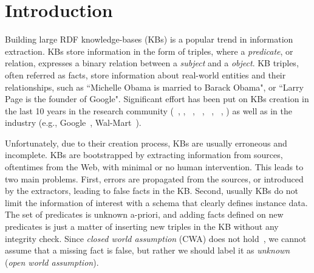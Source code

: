 \section{Introduction}

Building large RDF knowledge-bases (KBs) is a popular trend in information extraction.
KBs store information in the form of triples, where a \emph{predicate}, or relation, expresses a binary relation between a \emph{subject} and a \emph{object}. KB triples, often referred as facts, store information about real-world entities and their relationships, such as %
``Michelle Obama is married to Barack Obama", or ``Larry Page is the founder of Google".
Significant effort has been put on KBs creation in the last 10 years in the research community (~\cite{bizer2009dbpedia}, \cite{bollacker2008freebase}, ~\cite{vrandevcic2014wikidata}, \deepdive~\cite{shin2015incremental}, ~\cite{suchanek2008yago}, ~\cite{carlson2010toward}, \cite{banko2007open}) as well as in the industry %
(e.g., 
Google~\cite{dong2014knowledge}, Wal-Mart~\cite{deshpande2013building}).

Unfortunately, due to their creation process, KBs are usually erroneous and incomplete.
KBs are bootstrapped by extracting information from sources, oftentimes from the Web, with minimal or no human intervention.  This leads to two main problems. First, errors are propagated from the sources, or introduced by the extractors, leading to false facts in the KB. Second, usually KBs do not limit the information of interest with a schema that clearly defines instance data. The set of predicates is unknown a-priori, and adding facts defined on new predicates is just a matter of inserting new triples in the KB without any integrity check.  
Since \emph{closed world assumption} (CWA) does not hold~\cite{dong2014knowledge,galarraga2015fast}, we cannot assume that a missing fact is false, but rather we should label it as \emph{unknown} (\emph{open world assumption}).


